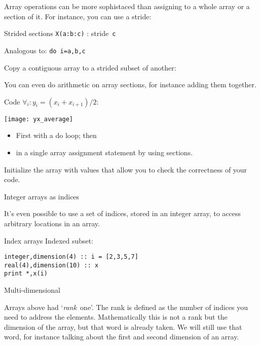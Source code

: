 Array operations can be more sophistaced than assigning to a whole
array or a section of it.
For instance, you can use a stride:

\begin{block}{Strided sections}
  \label{sl:farray-strideassign}
  \lstinline+X(a:b:c)+ : stride~\lstinline{c}
  
  Analogous to: \lstinline{do i=a,b,c}

  Copy a contiguous array to a strided subset of another:
\end{block}

You can even do arithmetic on array sections,
for instance adding them together.

\begin{exercise}
  \label{ex:farray-shift}
  Code $\forall_i\colon y_i=(x_i+x_{i+1})/2$:

  \texttt{[image: yx\_average]}

  \begin{itemize}
  \item First with a do loop; then
  \item in a single array assignment statement by using sections.
  \end{itemize}
  Initialize the array  with values that allow you to check the
  correctness of your code.
\end{exercise}

 {Integer arrays as indices}

It's even possible to use a set of indices,
stored in an integer array,
to access arbitrary locations in an array.

\begin{block}{Index arrays}
  \label{sl:farray-indexarray}
  Indexed subset:
\begin{lstlisting}
integer,dimension(4) :: i = [2,3,5,7]
real(4),dimension(10) :: x
print *,x(i)
\end{lstlisting}
\end{block}

 {Multi-dimensional}
\label{sec:farray-multid}

Arrays above had `\emph{rank}~one'. The rank is
defined as the number of indices you need to address the elements.
Mathematically this is not a rank but the dimension of the array,
but that word is already taken.
We will still use that word,
for instance talking about the first and second dimension of an array.

